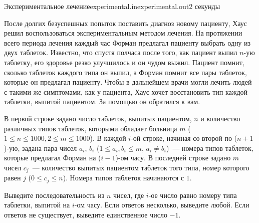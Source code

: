\begin{problem}{Экспериментальное лечение}{experimental.in}{experimental.out}{2 секунды}


После долгих безуспешных попыток поставить диагноз новому пациенту, Хаус решил воспользоваться экспериментальным методом лечения.
На протяжении всего периода лечения каждый час Форман предлагал пациенту выбрать одну из двух таблеток. Известно, что спустя полчаса 
после того, как пациент выпил $n$-ую таблетку, его здоровье резко улучшилось и он чудом выжил. Пациент помнит, сколько таблеток
каждого типа он выпил, а Форман помнит все пары таблеток, которые он предлагал пациенту. Чтобы в дальнейшем врачи могли лечить людей с такими же
симптомами, как у пациента, Хаус хочет восстановить тип каждой таблетки, выпитой пациентом. За помощью он обратился к вам.  


\InputFile
В первой строке задано число таблеток, выпитых пациентом, $n$ и количество различных типов таблеток, которыми обладает больница $m$
($1 \le n \le 1000, 2 \le  m \le 1000$).
В каждой $i$-ой строке, начиная со второй по ($n+1$)-ую, задана пара чисел $a_i$, $b_i$ ($1 \le a_i, b_i \le m$, $a_i \ne b_i$)~--- 
номера типов таблеток, которые предлагал Форман на ($i-1$)-ом часу.
В последней строке задано $m$ чисел $c_j$~--- количество выпитых пациентом таблеток того типа, номер которого равен $j$ ($0 \le c_j \le n$).
Номера типов таблеток начинаются с $1$.

\OutputFile               
Выведите последовательность из $n$ чисел, где $i$-ое число равно номеру типа таблетки, выпитой на $i$-ом часу. 
Если ответов несколько, выведите любой. Если ответов не существует, выведите единственное число $-1$. 
\Examples
\begin{example}%
%
%
\end{example}

\end{problem}
